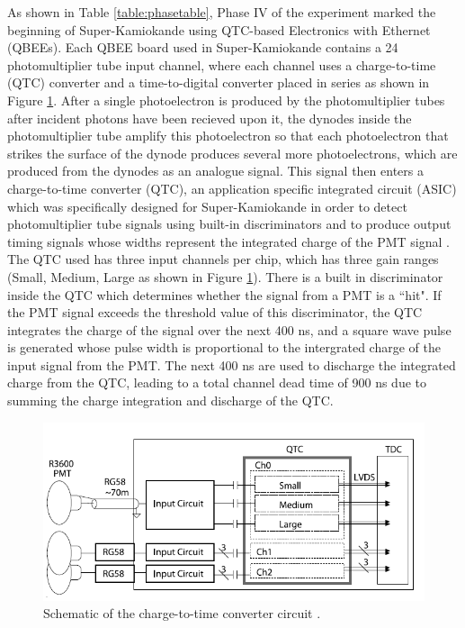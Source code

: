 As shown in Table \ref{table:phasetable}, Phase IV of the experiment marked the beginning of Super-Kamiokande using QTC-based Electronics with Ethernet (QBEEs). Each QBEE board used in Super-Kamiokande contains a 24 photomultiplier tube input channel, where each channel uses a charge-to-time (QTC) converter and a time-to-digital converter placed in series as shown in Figure \ref{fig:superkdaq}. After a single photoelectron is produced by the photomultiplier tubes after incident photons have been recieved upon it, the dynodes inside the photomultiplier tube amplify this photoelectron so that each photoelectron that strikes the surface of the dynode produces several more photoelectrons, which are produced from the dynodes as an analogue signal. This signal then enters a charge-to-time converter (QTC), an application specific integrated circuit (ASIC) which was specifically designed for Super-Kamiokande in order to detect photomultiplier tube signals using built-in discriminators and to produce output timing signals whose widths represent the integrated charge of the PMT signal \cite{xu2016current}. The QTC used has three input channels per chip, which has three gain ranges (Small, Medium, Large as shown in Figure \ref{fig:superkdaq}). There is a built in discriminator inside the QTC which determines whether the signal from a PMT is a ``hit". If the PMT signal exceeds the threshold value of this discriminator, the QTC integrates the charge of the signal over the next 400 ns, and a square wave pulse is generated whose pulse width is proportional to the intergrated charge of the input signal from the PMT. The next 400 ns are used to discharge the integrated charge from the QTC, leading to a total channel dead time of 900 ns due to summing the charge integration and discharge of the QTC. 
\newline

\begin{figure}
    \includegraphics[width=\textwidth]{Figures/superk_daq.png}
\caption{Schematic of the charge-to-time converter circuit \cite{nishino_high-speed_2009}.}
    \label{fig:superkdaq}
\end{figure}

